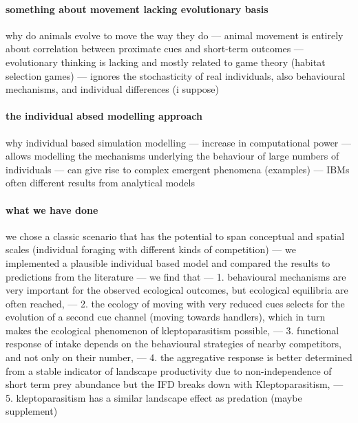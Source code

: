 \documentclass[11pt]{article}
\begin{document}
\paragraph{something about movement lacking evolutionary basis}

why do animals evolve to move the way they do --- animal movement is entirely about correlation between proximate cues and short-term outcomes --- evolutionary thinking is lacking and mostly related to game theory (habitat selection games) --- ignores the stochasticity of real individuals, also behavioural mechanisms, and individual differences (i suppose)

\paragraph{the individual absed modelling approach}

why individual based simulation modelling --- increase in computational power --- allows modelling the mechanisms underlying the behaviour of large numbers of individuals --- can give rise to complex emergent phenomena (examples) --- IBMs often different results from analytical models

\paragraph{what we have done}

we chose a classic scenario that has the potential to span conceptual and spatial scales (individual foraging with different kinds of competition) --- we implemented a plausible individual based model and compared the results to predictions from the literature --- we find that --- 1. behavioural mechanisms are very important for the observed ecological outcomes, but ecological equilibria are often reached, --- 2. the ecology of moving with very reduced cues selects for the evolution of a second cue channel (moving towards handlers), which in turn makes the ecological phenomenon of kleptoparasitism possible, --- 3. functional response of intake depends on the behavioural strategies of nearby competitors, and not only on their number, --- 4. the aggregative response is better determined from a stable indicator of landscape productivity due to non-independence of short term prey abundance but the IFD breaks down with Kleptoparasitism, --- 5. kleptoparasitism has a similar landscape effect as predation (maybe supplement)

\end{document}

